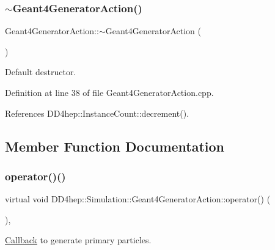 \subsubsection{\texorpdfstring{$\sim$\+Geant4\+Generator\+Action()}{~Geant4GeneratorAction()}}
{\footnotesize\ttfamily Geant4\+Generator\+Action\+::$\sim$\+Geant4\+Generator\+Action (\begin{DoxyParamCaption}{ }\end{DoxyParamCaption})\hspace{0.3cm}{\ttfamily [virtual]}}



Default destructor. 



Definition at line 38 of file Geant4\+Generator\+Action.\+cpp.



References D\+D4hep\+::\+Instance\+Count\+::decrement().



\subsection{Member Function Documentation}
\hypertarget{class_d_d4hep_1_1_simulation_1_1_geant4_generator_action_ac5a1d2335a19e3f9d555081199e01801}{}\label{class_d_d4hep_1_1_simulation_1_1_geant4_generator_action_ac5a1d2335a19e3f9d555081199e01801} 
\subsubsection{\texorpdfstring{operator()()}{operator()()}}
{\footnotesize\ttfamily virtual void D\+D4hep\+::\+Simulation\+::\+Geant4\+Generator\+Action\+::operator() (\begin{DoxyParamCaption}\item[{G4\+Event $\ast$}]{ }\end{DoxyParamCaption})\hspace{0.3cm}{\ttfamily [inline]}, {\ttfamily [virtual]}}



\hyperlink{class_d_d4hep_1_1_callback}{Callback} to generate primary particles. 



